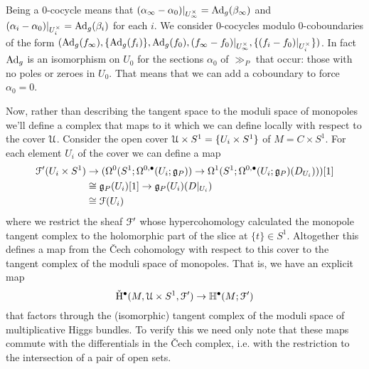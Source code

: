 \documentclass[10pt, oneside]{article}
\begin{document}
Being a 0-cocycle means that $(\alpha_\infty - \alpha_0)|_{U^\times_\infty} = \mathrm{Ad}_g(\beta_\infty)$ and $(\alpha_i - \alpha_0)|_{U^\times_i} = \mathrm{Ad}_g(\beta_i)$ for each $i$.  We consider 0-cocycles modulo 0-coboundaries of the form $(\mathrm{Ad}_g(f_\infty), \{\mathrm{Ad}_g(f_i)\}, \mathrm{Ad}_g(f_0), (f_\infty -  f_0)|_{U_\infty^\times}, \{(f_i - f_0)|_{U_i^\times}\})$.  In fact $\mathrm{Ad}_g$ is an isomorphism on $U_0$ for the sections $\alpha_0$ of $\gg_P$ that occur: those with no poles or zeroes in $U_0$.  That means that we can add a coboundary to force $\alpha_0=0$.  %

Now, rather than describing the tangent space to the moduli space of monopoles we'll define a complex that maps to it which we can define locally with respect to the cover $\mathcal{U}$.  Consider the open cover $\mathcal{U} \times S^1 = \{U_i \times S^1\}$ of $M = C \times S^1$.  For each element $U_i$ of the cover we can define a map
\begin{align*}
\mc F'(U_i \times S^1) &\to (\Omega^0(S^1; \Omega^{0,\bullet}(U_i; \gg_P)) \to \Omega^1(S^1; \Omega^{0,\bullet}(U_i; \gg_P)(D_{U_i})))[1] \\ %
&\iso \gg_P(U_i)[1] \to \gg_P(U_i)(D|_{U_i}) \\
&\iso \mc F(U_i)
\end{align*}
where we restrict the sheaf $\mathcal{F}'$ whose hypercohomology calculated the monopole tangent complex to the holomorphic part of the slice at $\{t\} \in S^1$.  Altogether this defines a map from the \v Cech cohomology with respect to this cover to the tangent complex of the moduli space of monopoles.  That is, we have an explicit map
\[{\mathrm{\check H}}^\bullet(M, \mathcal{U} \times S^1, \mathcal{F}') \to \mathbb{H}^\bullet(M; \mathcal{F}')\]
that factors through the (isomorphic) tangent complex of the moduli space of multiplicative Higgs bundles.  To verify this we need only note that these maps commute with the differentials in the \v Cech complex, i.e. with the restriction to the intersection of a pair of open sets. 
\end{document}
